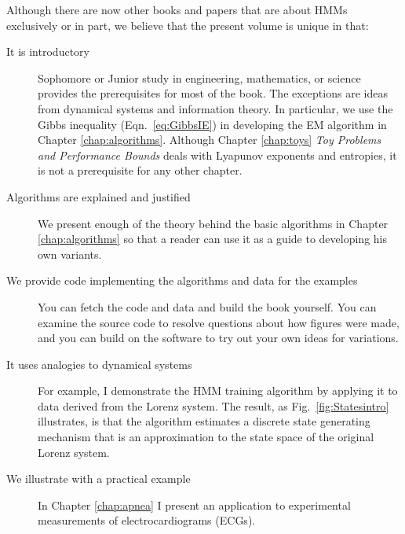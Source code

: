 \documentclass[ltxbook,showlabels, commentsvisible]{hmmdsbook}
\begin{document}
Although there are now other books and papers that are about HMMs
exclusively or in part, we believe that the present volume is unique in
that:
\begin{description}
\item[It is introductory] Sophomore or Junior study in engineering,
  mathematics, or science provides the prerequisites for most of the
  book.  The exceptions are ideas from dynamical systems and
  information theory.  In particular, we use the Gibbs inequality
  (Eqn.~\eqref{eq:GibbsIE}) in developing the EM algorithm in Chapter
  \ref{chap:algorithms}.  Although Chapter \ref{chap:toys} \emph{Toy
    Problems and Performance Bounds} deals with Lyapunov exponents and
  entropies, it is not a prerequisite for any other chapter.
\item[Algorithms are explained and justified] We present enough of the
  theory behind the basic algorithms in Chapter \ref{chap:algorithms}
  so that a reader can use it as a guide to developing his own
  variants.
\item[We provide code implementing the algorithms and data for the
  examples] You can fetch the code and data and build the book
  yourself.  You can examine the source code to resolve questions
  about how figures were made, and you can build on the software to
  try out your own ideas for variations.
\item[It uses analogies to dynamical systems] For example, I
  demonstrate the HMM training algorithm by applying it to data
  derived from the Lorenz system.  The result, as
  Fig.~\ref{fig:Statesintro} illustrates, is that the algorithm
  estimates a discrete state generating mechanism that is an
  approximation to the state space of the original Lorenz system.
\item[We illustrate with a practical example] In Chapter \ref{chap:apnea} I
  present an application to experimental measurements of
  electrocardiograms (ECGs).  
\end{description}

\end{document}

